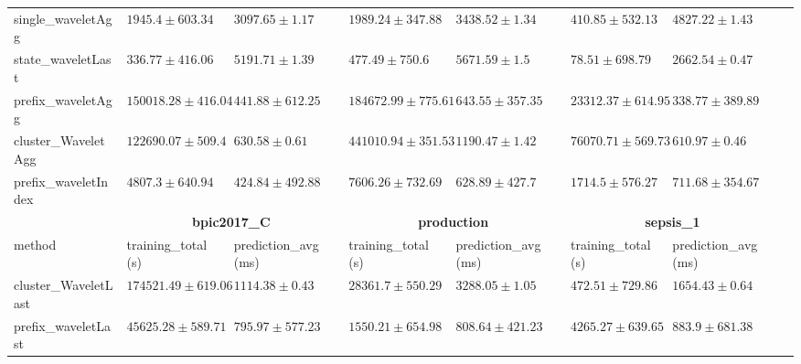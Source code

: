 \documentclass[twoside,11pt]{Latex/Classes/PhDthesisPSnPDF}
\begin{document}
\begin{table}[h]
{\begin{tabular}{llllllll}
				single\_waveletAgg & $1945.4 \pm 603.34$ & $3097.65 \pm 1.17$ & $1989.24 \pm 347.88$ & $3438.52 \pm 1.34$ & $410.85 \pm 532.13$ & $4827.22 \pm 1.43$ \\ 
				state\_waveletLast & $336.77 \pm 416.06$ & $5191.71 \pm 1.39$ & $477.49 \pm 750.6$ & $5671.59 \pm 1.5$ & $78.51 \pm 698.79$ & $2662.54 \pm 0.47$ \\ 
				prefix\_waveletAgg & $150018.28 \pm 416.04$ & $441.88 \pm 612.25$ & $184672.99 \pm 775.61$ & $643.55 \pm 357.35$ & $23312.37 \pm 614.95$ & $\mathbf{338.77 \pm 389.89}$ \\ 
				cluster\_WaveletAgg & $122690.07 \pm 509.4$ & $630.58 \pm 0.61$ & $441010.94 \pm 351.53$ & $1190.47 \pm 1.42$ & $76070.71 \pm 569.73$ & $610.97 \pm 0.46$ \\ 
				prefix\_waveletIndex & $4807.3 \pm 640.94$ & $\mathbf{424.84 \pm 492.88}$ & $7606.26 \pm 732.69$ & $\mathbf{628.89 \pm 427.7}$ & $1714.5 \pm 576.27$ & $711.68 \pm 354.67$ \\ 
				\bottomrule
				\toprule
				& \multicolumn{2}{c}{{\bfseries bpic2017\_C}} & \multicolumn{2}{c}{{\bfseries production}} & \multicolumn{2}{c}{{\bfseries sepsis\_1}} \\ \cmidrule(lr){2-3} \cmidrule(lr){4-5} \cmidrule(lr){6-7}
				method  & training\_total (s) & prediction\_avg (ms) & training\_total (s) & prediction\_avg (ms) & training\_total (s) & prediction\_avg (ms) \\ \midrule
				cluster\_WaveletLast & $174521.49 \pm 619.06$ & $1114.38 \pm 0.43$ & $28361.7 \pm 550.29$ & $3288.05 \pm 1.05$ & $472.51 \pm 729.86$ & $1654.43 \pm 0.64$ \\ 
				prefix\_waveletLast & $45625.28 \pm 589.71$ & $795.97 \pm 577.23$ & $1550.21 \pm 654.98$ & $808.64 \pm 421.23$ & $4265.27 \pm 639.65$ & $883.9 \pm 681.38$ \\ 
				

\end{tabular}}
\end{table}
\end{document}
